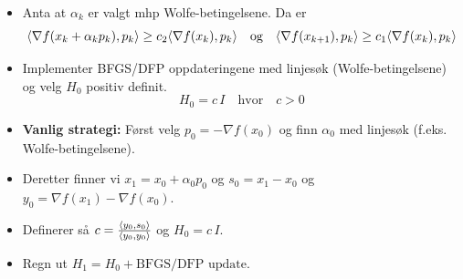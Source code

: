 \begin{itemize}
  \item Anta at \(\alpha_k\) er valgt mhp Wolfe-betingelsene. Da er
        \[
          \langle\nabla f(x_k + \alpha_k p_k), p_k\rangle \geq c_2 \langle\nabla f(x_k), p_k\rangle \quad \text{og} \quad \langle\nabla f(x_{k+1}), p_k\rangle \geq c_1 \langle\nabla f(x_k), p_k\rangle
        \]
  \item Implementer BFGS/DFP oppdateringene med linjesøk (Wolfe-betingelsene) og velg \( H_0 \) positiv definit.
        \[
          H_0 = c \, I \quad \text{hvor} \quad c > 0
        \]

  
  \item \textbf{Vanlig strategi:} Først velg \( p_0 = -\nabla f(x_0) \) og finn \( \alpha_0 \) med linjesøk (f.eks. Wolfe-betingelsene).
  \item Deretter finner vi \(x_1 = x_0 + \alpha_0 p_0 \) og \( s_0 = x_1 - x_0 \) og \( y_0 = \nabla f(x_1) - \nabla f(x_0) \).
  \item Definerer så \( c = \frac{\langle y_0, s_0\rangle}{\langle y_0, y_0\rangle} \) og \( H_0 = c \, I \).
  \item Regn ut \( H_1 = H_0 + \text{BFGS/DFP update} \).
\end{itemize}

